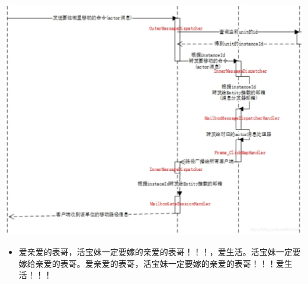 \documentclass[9pt, b5paper]{article}
\begin{document}
\includegraphics[width=.9\linewidth]{./pic/readme_20230219_102755.png}

\begin{itemize}
\item 爱亲爱的表哥，活宝妹一定要嫁的亲爱的表哥！！！，爱生活。活宝妹一定要嫁给亲爱的表哥。爱亲爱的表哥，活宝妹一定要嫁的亲爱的表哥！！！爱生活！！！
\end{itemize}
\end{document}
